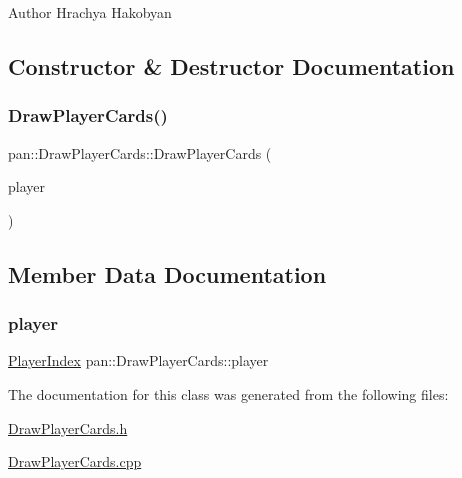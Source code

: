 \begin{DoxyAuthor}{Author}
Hrachya Hakobyan 
\end{DoxyAuthor}


\subsection{Constructor \& Destructor Documentation}
\mbox{\label{classpan_1_1_draw_player_cards_ad76432d661eb15b69cc3236fd8f4f896}} 
\subsubsection{\texorpdfstring{Draw\+Player\+Cards()}{DrawPlayerCards()}}
{\footnotesize\ttfamily pan\+::\+Draw\+Player\+Cards\+::\+Draw\+Player\+Cards (\begin{DoxyParamCaption}\item[{\hyperlink{namespacepan_a0cdabf874fbf1bb3a1f0152d108c2909}{Player\+Index}}]{player }\end{DoxyParamCaption})}



\subsection{Member Data Documentation}
\mbox{\label{classpan_1_1_draw_player_cards_a62969ce5dc8a1eeaa104acd073d3971b}} 
\subsubsection{\texorpdfstring{player}{player}}
{\footnotesize\ttfamily \hyperlink{namespacepan_a0cdabf874fbf1bb3a1f0152d108c2909}{Player\+Index} pan\+::\+Draw\+Player\+Cards\+::player}



The documentation for this class was generated from the following files\+:\begin{DoxyCompactItemize}
\item 
\hyperlink{_draw_player_cards_8h}{Draw\+Player\+Cards.\+h}\item 
\hyperlink{_draw_player_cards_8cpp}{Draw\+Player\+Cards.\+cpp}\end{DoxyCompactItemize}

